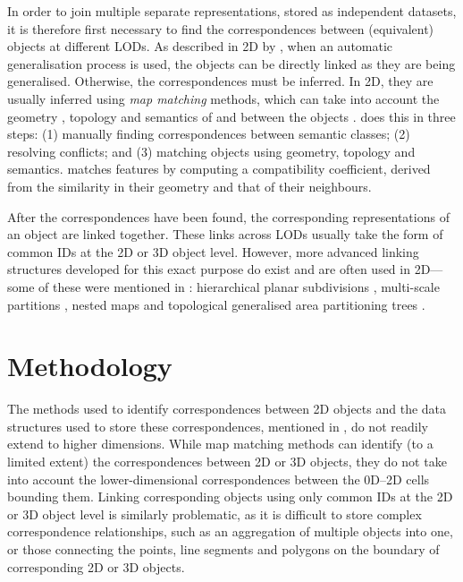 In order to join multiple separate representations, stored as independent datasets, it is therefore first necessary to find the correspondences between (equivalent) objects at different LODs.
As described in 2D by \citet{Hampe03}, when an automatic generalisation process is used, the objects can be directly linked as they are being generalised.
Otherwise, the correspondences must be inferred.
In 2D, they are usually inferred using \emph{map matching} methods, which can take into account the geometry \citep{Veltkamp01}, topology and semantics of and between the objects \citep{Devogele96}.
\citet{Devogele96} does this in three steps: (1) manually finding correspondences between semantic classes; (2) resolving conflicts; and (3) matching objects using geometry, topology and semantics.
\citet{Zhang14} matches features by computing a compatibility coefficient, derived from the similarity in their geometry and that of their neighbours.

After the correspondences have been found, the corresponding representations of an object are linked together.
These links across LODs usually take the form of common IDs at the 2D or 3D object level.
However, more advanced linking structures developed for this exact purpose do exist and are often used in 2D---some of these were mentioned in : hierarchical planar subdivisions \citep{Filho95}, multi-scale partitions \citep{Rigaux95}, nested maps \citep{Plumer97} and topological generalised area partitioning trees \citep{vanOosterom05}.

\section{Methodology}
\label{se:linking-methodology}

The methods used to identify correspondences between 2D objects and the data structures used to store these correspondences, mentioned in , do not readily extend to higher dimensions.
While map matching methods can identify (to a limited extent) the correspondences between 2D or 3D objects, they do not take into account the lower-dimensional correspondences between the 0D--2D cells bounding them.
Linking corresponding objects using only common IDs at the 2D or 3D object level is similarly problematic, as it is difficult to store complex correspondence relationships, such as an aggregation of multiple objects into one, or those connecting the points, line segments and polygons on the boundary of corresponding 2D or 3D objects.

